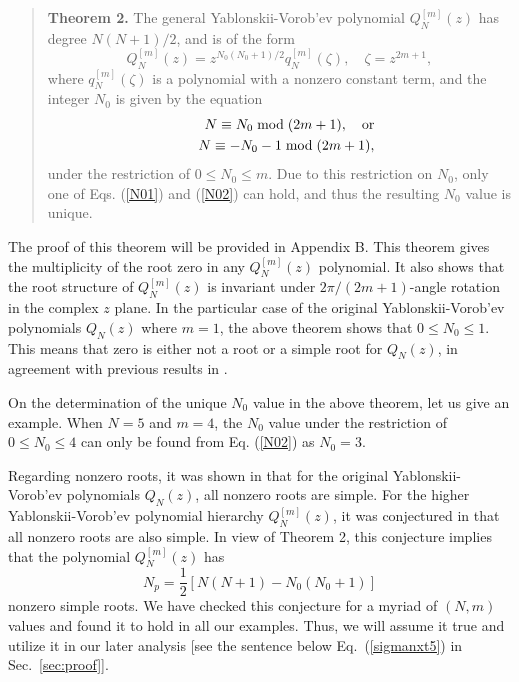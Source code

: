 \documentclass[amsmath,amssymb]{revtex4}
\def\[{\begin{equation}}
\def\]{\end{equation}}
\begin{document}
\begin{quote}
\textbf{Theorem 2.} The general Yablonskii-Vorob'ev polynomial $Q_{N}^{[m]}(z)$ has degree $N(N+1)/2$, and is of the form
\[ \label{QNmform}
Q_{N}^{[m]}(z)=z^{N_0(N_0+1)/2}q_{N}^{[m]}(\zeta), \quad \zeta=z^{2m+1},
\]
where $q_{N}^{[m]}(\zeta)$ is a polynomial with a nonzero constant term, and the integer $N_0$ is given by the equation
\begin{eqnarray}
&&N\equiv N_{0} \hspace{0.1cm} \mbox{mod} \hspace{0.1cm} (2m+1), \quad \text{or}   \label{N01}\\
&&N\equiv -N_{0}-1 \hspace{0.1cm} \mbox{mod} \hspace{0.1cm} (2m+1),   \label{N02}
\end{eqnarray}
under the restriction of $0\leq  N_{0} \leq m$. Due to this restriction on $N_0$, only one of Eqs.  (\ref{N01}) and (\ref{N02}) can hold, and thus the resulting $N_0$ value is unique.
\end{quote}
The proof of this theorem will be provided in Appendix B. This theorem gives the multiplicity of the root zero in any $Q_{N}^{[m]}(z)$ polynomial. It also shows that the root structure of $Q_{N}^{[m]}(z)$ is invariant under $2\pi/(2m+1)$-angle rotation in the complex $z$ plane. In the particular case of the original Yablonskii-Vorob'ev polynomials $Q_{N}(z)$ where $m=1$, the above theorem shows that $0\le N_0\le 1$. This means that zero is either not a root or a simple root for $Q_{N}(z)$, in agreement with previous results in \cite{Fukutani,Taneda}.

On the determination of the unique $N_0$ value in the above theorem, let us give an example. When $N=5$ and $m=4$, the $N_0$ value under the restriction of $0\le N_0\le 4$ can only be found from Eq. (\ref{N02}) as $N_0=3$.

Regarding nonzero roots, it was shown in \cite{Fukutani} that for the original Yablonskii-Vorob'ev polynomials $Q_{N}(z)$, all nonzero roots are simple. For the higher Yablonskii-Vorob'ev polynomial hierarchy $Q_{N}^{[m]}(z)$, it was conjectured in \cite{Clarkson2003-II} that all nonzero roots are also simple.
In view of Theorem 2, this conjecture implies that the polynomial $Q_{N}^{[m]}(z)$ has
\[ \label{Np}
N_p=\frac{1}{2}\left[N(N+1)-N_{0}(N_{0}+1)\right]
\]
nonzero simple roots. We have checked this conjecture for a myriad of $(N, m)$ values and found it to hold in all our examples. Thus, we will assume it true and utilize it in our later analysis [see the sentence below Eq.~(\ref{sigmanxt5}) in Sec.~\ref{sec:proof}].
\end{document}
